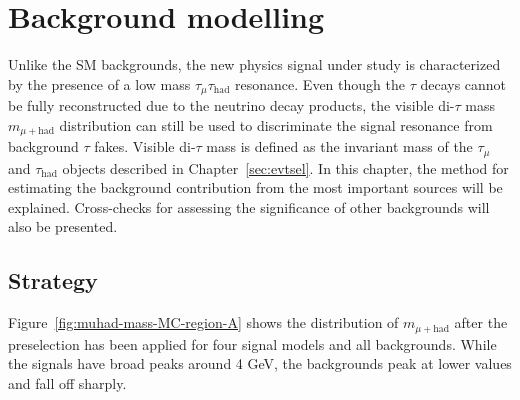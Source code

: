 \chapter{Background modelling\label{sec:bkg}}

Unlike the SM backgrounds, the new physics signal under study is characterized by the presence of a low mass $\tau_\mu\tau_\text{had}$ resonance. Even though the $\tau$ decays cannot be fully reconstructed due to the neutrino decay products, the visible di-$\tau$ mass $m_{\mu+\text{had}}$ distribution can still be used to discriminate the signal resonance from background $\tau$ fakes. Visible di-$\tau$ mass is defined as the invariant mass of the $\tau_\mu$ and $\tau_\text{had}$ objects described in Chapter~\ref{sec:evtsel}. In this chapter, the method for estimating the background contribution from the most important sources will be explained. Cross-checks for assessing the significance of other backgrounds will also be presented.

\section{Strategy\label{sec:bkg-strategy}}

Figure~\ref{fig:muhad-mass-MC-region-A} shows the distribution of $m_{\mu+\text{had}}$ after the preselection has been applied for four signal models and all backgrounds.  While the signals have broad peaks around 4 GeV, the backgrounds peak at lower values and fall off sharply.

